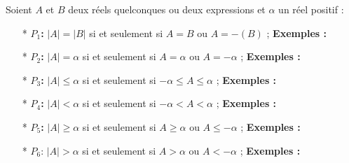 \documentclass[12pt]{article}
\begin{document}
Soient $A$ et $B$ deux réels quelconques ou deux expressions et $\alpha$ un réel positif :
\begin{itemize}
    \item[*] \textbf{ $P_1$:} $|A| = |B|$ si et seulement si $A = B$ ou $A = -(B)$ ;  
    \textbf{Exemples :}
    \item[*] \textbf{ $P_2$:} $|A| = \alpha$ si et seulement si $A = \alpha$ ou $A = -\alpha$ ;  
    \textbf{Exemples :}
    \item[*] \textbf{ $P_3$:} $|A| \leq \alpha$ si et seulement si $-\alpha \leq A \leq \alpha$ ;  
    \textbf{Exemples :}
    \item[*] \textbf{ $P_4$:} $|A| < \alpha$ si et seulement si $-\alpha < A < \alpha$ ;  
    \textbf{Exemples :}
    \item[*] \textbf{ $P_5$:} $|A| \geq \alpha$ si et seulement si $A \geq \alpha$ ou $A \leq -\alpha$ ;  
    \textbf{Exemples :}
    \item[*]  $P_6$: $|A| > \alpha$ si et seulement si $A > \alpha$ ou $A < -\alpha$ ;  
    \textbf{Exemples :}
\end{itemize}
\end{document}
